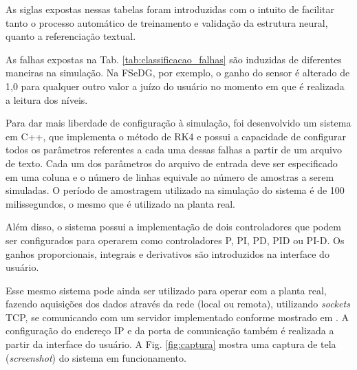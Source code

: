 
As siglas expostas nessas tabelas foram introduzidas com o intuito de facilitar
tanto o processo automático de treinamento e validação da estrutura neural,
quanto a referenciação textual.

As falhas expostas na Tab. \ref{tab:classificacao_falhas} são induzidas de
diferentes maneiras na simulação. Na FSeDG, por exemplo, o ganho do sensor é
alterado de 1,0 para qualquer outro valor a juízo do usuário no momento em que é
realizada a leitura dos níveis.

Para dar mais liberdade de configuração à simulação, foi desenvolvido um sistema
em C++, que implementa o método de RK4 e possui a capacidade de configurar todos
os parâmetros referentes a cada uma dessas falhas a partir de um arquivo de
texto. Cada um dos parâmetros do arquivo de entrada deve ser especificado em uma
coluna e o número de linhas equivale ao número de amostras a serem simuladas. O
período de amostragem utilizado na simulação do sistema é de 100
milissegundos, o mesmo que é utilizado na planta real.

Além disso, o sistema possui a implementação de dois controladores que podem ser
configurados para operarem como controladores P, PI, PD, PID ou PI-D. Os ganhos
proporcionais, integrais e derivativos são introduzidos na interface do usuário.

Esse mesmo sistema pode ainda ser utilizado para operar com a planta real,
fazendo aquisições dos dados através da rede (local ou remota), utilizando {\it
sockets} TCP, se comunicando com um servidor implementado conforme mostrado em
. A configuração do endereço IP e da porta de
comunicação também é realizada a partir da interface do usuário. A Fig.
\ref{fig:captura} mostra uma captura de tela ({\it screenshot}) do sistema em
funcionamento.

